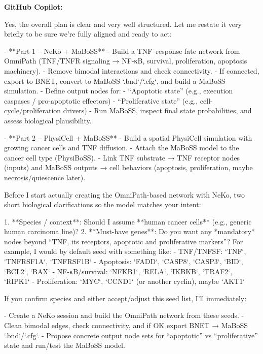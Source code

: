 \documentclass[11pt,a4paper]{article}
\begin{document}
\begin{copilotbox}
\textbf{GitHub Copilot:}

Yes, the overall plan is clear and very well structured. Let me restate it very briefly to be sure we’re fully aligned and ready to act:

- **Part 1 – NeKo + MaBoSS**
  - Build a TNF–response fate network from OmniPath (TNF/TNFR signaling → NF-κB, survival, proliferation, apoptosis machinery).
  - Remove bimodal interactions and check connectivity.
  - If connected, export to BNET, convert to MaBoSS `.bnd`/`.cfg`, and build a MaBoSS simulation.
  - Define output nodes for:
    - “Apoptotic state” (e.g., execution caspases / pro-apoptotic effectors)
    - “Proliferative state” (e.g., cell-cycle/proliferation drivers)
  - Run MaBoSS, inspect final state probabilities, and assess biological plausibility.

- **Part 2 – PhysiCell + MaBoSS**
  - Build a spatial PhysiCell simulation with growing cancer cells and TNF diffusion.
  - Attach the MaBoSS model to the cancer cell type (PhysiBoSS).
  - Link TNF substrate → TNF receptor nodes (inputs) and MaBoSS outputs → cell behaviors (apoptosis, proliferation, maybe necrosis/quiescence later).

Before I start actually creating the OmniPath-based network with NeKo, two short biological clarifications so the model matches your intent:

1. **Species / context**: Should I assume **human cancer cells** (e.g., generic human carcinoma line)?
2. **Must-have genes**: Do you want any *mandatory* nodes beyond “TNF, its receptors, apoptotic and proliferative markers”?  
   For example, I would by default seed with something like:
   - TNF/TNFSF: `TNF`, `TNFRSF1A`, `TNFRSF1B`
   - Apoptosis: `FADD`, `CASP8`, `CASP3`, `BID`, `BCL2`, `BAX`
   - NF-κB/survival: `NFKB1`, `RELA`, `IKBKB`, `TRAF2`, `RIPK1`
   - Proliferation: `MYC`, `CCND1` (or another cyclin), maybe `AKT1`

If you confirm species and either accept/adjust this seed list, I’ll immediately:

- Create a NeKo session and build the OmniPath network from these seeds.
- Clean bimodal edges, check connectivity, and if OK export BNET → MaBoSS `.bnd`/`.cfg`.
- Propose concrete output node sets for “apoptotic” vs “proliferative” state and run/test the MaBoSS model.

\end{copilotbox}
\end{document}
